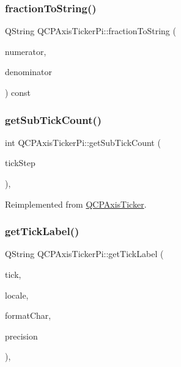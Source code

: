 \subsubsection{\texorpdfstring{fractionToString()}{fractionToString()}}
{\footnotesize\ttfamily Q\+String Q\+C\+P\+Axis\+Ticker\+Pi\+::fraction\+To\+String (\begin{DoxyParamCaption}\item[{int}]{numerator,  }\item[{int}]{denominator }\end{DoxyParamCaption}) const\hspace{0.3cm}{\ttfamily [protected]}}

\mbox{\label{class_q_c_p_axis_ticker_pi_a56c90f870da97c8670cfae4d04ff3ac7}} 
\subsubsection{\texorpdfstring{getSubTickCount()}{getSubTickCount()}}
{\footnotesize\ttfamily int Q\+C\+P\+Axis\+Ticker\+Pi\+::get\+Sub\+Tick\+Count (\begin{DoxyParamCaption}\item[{double}]{tick\+Step }\end{DoxyParamCaption})\hspace{0.3cm}{\ttfamily [protected]}, {\ttfamily [virtual]}}



Reimplemented from \mbox{\hyperlink{class_q_c_p_axis_ticker_a4ccc403ced7a1457ce6ba293509933c8}{Q\+C\+P\+Axis\+Ticker}}.

\mbox{\label{class_q_c_p_axis_ticker_pi_a9a087d931d4344b8a91d5cecceff7109}} 
\subsubsection{\texorpdfstring{getTickLabel()}{getTickLabel()}}
{\footnotesize\ttfamily Q\+String Q\+C\+P\+Axis\+Ticker\+Pi\+::get\+Tick\+Label (\begin{DoxyParamCaption}\item[{double}]{tick,  }\item[{const Q\+Locale \&}]{locale,  }\item[{Q\+Char}]{format\+Char,  }\item[{int}]{precision }\end{DoxyParamCaption})\hspace{0.3cm}{\ttfamily [protected]}, {\ttfamily [virtual]}}



